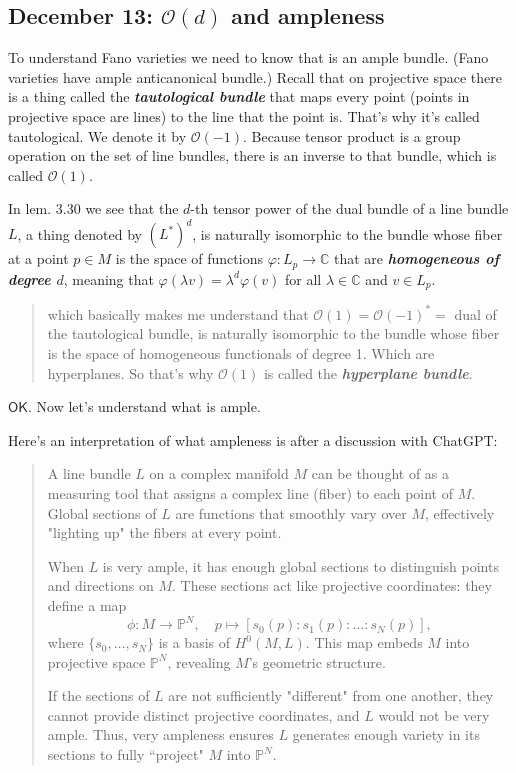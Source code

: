 \subsection{December 13: $\mathcal{O}(d)$ and ampleness}

To understand Fano varieties we need to know that is an ample bundle. (Fano varieties have ample anticanonical bundle.) Recall that on projective space there is a thing called the \textit{\textbf{tautological bundle}} that maps every point (points in projective space are lines) to the line that the point is. That's why it's called tautological. We denote it by $\mathcal{O}(-1)$. Because tensor product is a group operation on the set of line bundles, there is an inverse to that bundle, which is called $\mathcal{O}(1)$.

In lem. 3.30 \cite{lec} we see that the $d$-th tensor power of the dual bundle of a line bundle $L$, a thing denoted by $(L^*)^d$, is naturally isomorphic to the bundle whose fiber at a point $p \in M$ is the space of functions $\varphi:L_p\to \mathbb{C}$ that are \textit{\textbf{homogeneous of degree $d$}}, meaning that $\varphi(\lambda v)=\lambda^d \varphi(v)$ for all $\lambda \in \mathbb{C}$ and $v \in L_p$.

\begin{quotation}
	which basically makes me understand that $\mathcal{O}(1)=\mathcal{O}(-1)^*=$ dual of the tautological bundle, is naturally isomorphic to the bundle whose fiber is the space of homogeneous functionals of degree 1. Which are hyperplanes. So that's why $\mathcal{O}(1)$ is called the \textit{\textbf{hyperplane bundle}}.
\end{quotation}

$\mathsf{OK}$. Now let's understand what is ample. 

Here's an interpretation of what ampleness is after a discussion with ChatGPT:

\begin{quotation}
A line bundle $L$ on a complex manifold $M$ can be thought of as a measuring tool that assigns a complex line (fiber) to each point of $M$. Global sections of $L$ are functions that smoothly vary over $M$, effectively "lighting up" the fibers at every point.

When $L$ is very ample, it has enough global sections to distinguish points and directions on $M$. These sections act like projective coordinates: they define a map
\[
\phi: M \to \mathbb{P}^N, \quad p \mapsto [s_0(p) : s_1(p) : \dots : s_N(p)],
\]
where $\{s_0, \dots, s_N\}$ is a basis of $H^0(M, L)$. This map embeds $M$ into projective space $\mathbb{P}^N$, revealing $M$'s geometric structure.

If the sections of $L$ are not sufficiently "different" from one another, they cannot provide distinct projective coordinates, and $L$ would not be very ample. Thus, very ampleness ensures $L$ generates enough variety in its sections to fully ``project" $M$ into $\mathbb{P}^N$.
\end{quotation}


